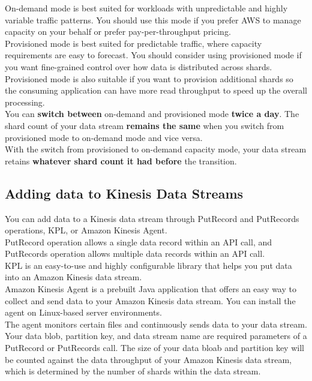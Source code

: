 \documentclass[12pt, letterpaper, twoside]{article}
\begin{document}
On-demand mode is best suited for workloads with unpredictable and highly variable traffic patterns. You should use this mode if you 
prefer AWS to manage capacity on your behalf or prefer pay-per-throughput pricing.\\
Provisioned mode is best suited for predictable traffic, where capacity requirements are easy to forecast. You should consider using 
provisioned mode if you want fine-grained control over how data is distributed across shards. Provisioned mode is also suitable if you 
want to provision additional shards so the consuming application can have more read throughput to speed up the overall processing.\\

You can \textbf{switch between} on-demand and provisioned mode \textbf{twice a day}. The shard count of your data stream \textbf{remains the same}
when you switch from provisioned mode to on-demand mode and vice versa.\\
With the switch from provisioned to on-demand capacity mode, your data stream retains \textbf{whatever shard count it had before} the transition.\\

\subsection{Adding data to Kinesis Data Streams}
You can add data to a Kinesis data stream through PutRecord and PutRecords operations, KPL, or Amazon Kinesis Agent.\\
PutRecord operation allows a single data record within an API call, and PutRecords operation allows multiple data records within 
an API call.\\
KPL is an easy-to-use and highly configurable library that helps you put data into an Amazon Kinesis data stream.\\

Amazon Kinesis Agent is a prebuilt Java application that offers an easy way to collect and send data to your Amazon Kinesis data stream. 
You can install the agent on Linux-based server environments.\\
The agent monitors certain files and continuously sends data to your data stream.\\

Your data blob, partition key, and data stream name are required parameters of a PutRecord or PutRecords call. The size of your data bloab 
and partition key will be counted against the data throughput of your Amazon Kinesis data stream, which is determined by the number of shards 
within the data stream.\\
\end{document}
